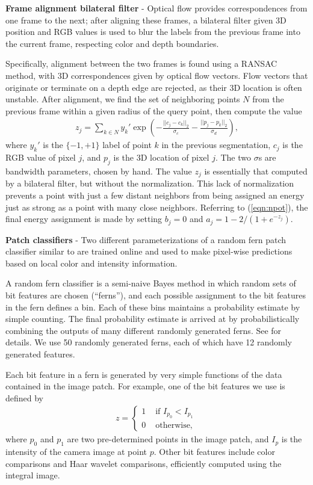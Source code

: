 \documentclass[journal]{IEEEtran}
\begin{document}
\textbf{Frame alignment bilateral filter} - Optical flow provides correspondences from one frame to the next; after aligning these frames, a bilateral filter given 3D position and RGB values is used to blur the labels from the previous frame into the current frame, respecting color and depth boundaries.

Specifically, alignment between the two frames is found using a RANSAC method, with 3D correspondences given by optical flow vectors.  Flow vectors that originate or terminate on a depth edge are rejected, as their 3D location is often unstable.  After alignment, we find the set of neighboring points $N$ from the previous frame within a given radius of the query point, then compute the value
\begin{align*}
  z_j = \sum_{k \in N} y_k' \exp \left(-\frac{||c_j - c_k||_2}{\sigma_c} - \frac{||p_j - p_k||_2}{\sigma_d} \right),
\end{align*}
where $y_k'$ is the $\{-1, +1\}$ label of point $k$ in the previous segmentation, $c_j$ is the RGB value of pixel $j$, and $p_j$ is the 3D location of pixel $j$. The two $\sigma$s are bandwidth parameters, chosen by hand.  The value $z_j$ is essentially that computed by a bilateral filter, but without the normalization.  This lack of normalization prevents a point with just a few distant neighbors from being assigned an energy just as strong as a point with many close neighbors. Referring to (\ref{eqn:npot}), the final energy assignment is made by setting $b_j = 0$ and $a_j = 1 - 2 / (1 + e^{-z_j})$.

\textbf{Patch classifiers} - Two different parameterizations of a random fern patch classifier similar to \cite{ozuysal2007a} are trained online and used to make pixel-wise predictions based on local color and intensity information.

A random fern classifier is a semi-naive Bayes method in which random sets of bit features are chosen (``ferns''), and each possible assignment to the bit features in the fern defines a bin.  Each of these bins maintains a probability estimate by simple counting.  The final probability estimate is arrived at by probabilistically combining the outputs of many different randomly generated ferns.  See \cite{ozuysal2007a} for details.  We use 50 randomly generated ferns, each of which have 12 randomly generated features.

Each bit feature in a fern is generated by very simple functions of the data contained in the image patch.  For example, one of the bit features we use is defined by
\begin{align*}
  z =
  \left\{
  \begin{array}{rl}
    1 & \mbox{ if } I_{p_0} < I_{p_1} \\
    0 & \mbox{ otherwise, }
  \end{array}
  \right.
\end{align*}
where $p_0$ and $p_1$ are two pre-determined points in the image patch, and $I_p$ is the intensity of the camera image at point $p$.  Other bit features include color comparisons and Haar wavelet comparisons, efficiently computed using the integral image.
\end{document}
